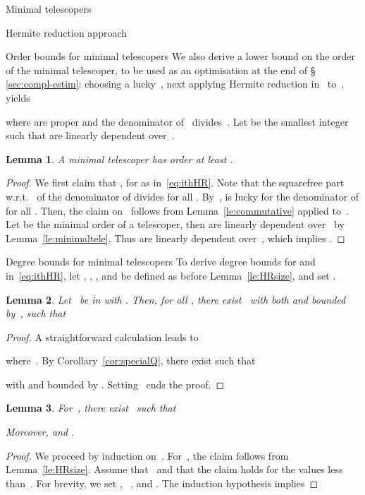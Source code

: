 \documentclass{sig-alt-full}
\newtheorem{lemma}{Lemma}
\begin{document}
\begin{section}{Minimal telescopers}
\begin{subsection}{Hermite reduction approach}
\begin{subsubsection}{Order bounds for minimal telescopers}
We also derive a lower bound on the order of the minimal telescoper,
to be used as an optimisation at the end of \S\,\ref{sec:compl-estim}:
choosing a lucky~,
next applying Hermite reduction in~ to~, yields

where  are proper and the denominator
of~ divides~.
Let  be the smallest integer such that  are linearly dependent over~.
\begin{lemma}\label{le:lowerbound}
A minimal telescoper has order at least .
\end{lemma}
\begin{proof}
We first claim that , for  as
in~\eqref{eq:ithHR}. Note that the squarefree part w.r.t.~ of the
denominator of  divides  for all .
By~\cite[Cor.~5.5]{Gerhard2004},  is lucky for the
denominator of  for all .
Then, the claim on~ follows from Lemma~\ref{le:commutative}
applied to~.
Let  be the
minimal order of a telescoper, then  are
linearly dependent over~ by Lemma~\ref{le:minimaltele}. Thus
 are linearly dependent over~,
which implies .
\end{proof}
\end{subsubsection}

\begin{subsubsection}{Degree bounds for minimal telescopers}
To derive degree bounds for  and 
in~\eqref{eq:ithHR},
let , , , and  be defined
as before Lemma~\ref{le:HRsize},
and set .

\begin{lemma} \label{le:special}
Let~ be in  with . Then, for all , there exist~ with both  and
 bounded by~, such that

\end{lemma}

\begin{proof}
A straightforward calculation leads to

where~.
By Corollary~\ref{cor:specialQ},
there exist  such that

with  and  bounded by
 .
Setting~
ends the proof.
\end{proof}

\begin{lemma} \label{le:ithsize}
For~, there exist~ such that

Moreover,  and .
\end{lemma}
\begin{proof}
We proceed by induction on~.
For~, the claim follows from
Lemma~\ref{le:HRsize}.
Assume that~ and that the claim holds
for the values less than~.
For brevity, we set ,
\ ,
and .
The induction hypothesis implies


\end{proof}
\end{subsubsection}
\end{subsection}
\end{section}
\end{document}
